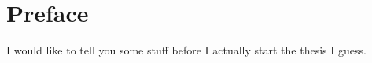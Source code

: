 \chapter*{Preface}

I would like to tell you some stuff before I actually start the thesis I guess.

\lipsum[20]
